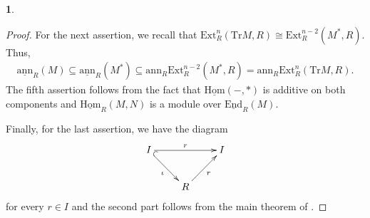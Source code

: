 \documentclass[12pt]{amsart}
\newcommand{\Ext}{\mathrm{Ext}}
\newcommand{\sHom}{\underline{\mathrm{Hom}}}
\newcommand{\sEnd}{\underline{\mathrm{End}}}
\newcommand{\ann}{\mathrm{ann}}
\newcommand{\sann}{\underline{\mathrm{ann}}}
\theoremstyle{definition}
\newtheorem{chunk}[theorem]{}
\numberwithin{equation}{theorem}
\newcommand{\Tr}{\mathrm{Tr}}
\begin{document}
\begin{chunk}
\begin{proof}
    For the next assertion, we recall that $\Ext_R^n(\Tr M, R) \cong \Ext_R^{n-2}(M^*, R)$. Thus, 
    \begin{align*}
        \sann_R(M) \subseteq \sann_R(M^*) \subseteq \ann_R\Ext_R^{n-2}(M^*, R) = \ann_R \Ext_R^n(\Tr M, R).
    \end{align*}
    The fifth assertion follows from the fact that $\sHom(-,*)$ is additive on both components and $\sHom_R(M,N)$ is a module over $\sEnd_R(M)$.
    
    Finally, for the last assertion, we have the diagram
    \begin{align*}
        \xymatrix{
            I \ar^{r}[rr] \ar@{^{(}->}[dr]_{\iota}  && I \\
            &R \ar[ur]_r&
            }
    \end{align*}
    for every $r \in I$ and the second part follows from the main theorem of \cite{Dey}.
\end{proof}
\end{chunk}
\end{document}
